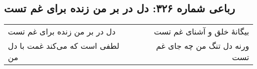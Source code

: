 \begin{center}
\section*{رباعی شماره ۳۲۶: دل در بر من زنده برای غم تست}
\label{sec:0326}
\begin{longtable}{l p{0.5cm} r}
دل در بر من زنده برای غم تست
&&
بیگانهٔ خلق و آشنای غم تست
\\
لطفی است که می‌کند غمت با دل من
&&
ورنه دل تنگ من چه جای غم تست
\\
\end{longtable}
\end{center}
